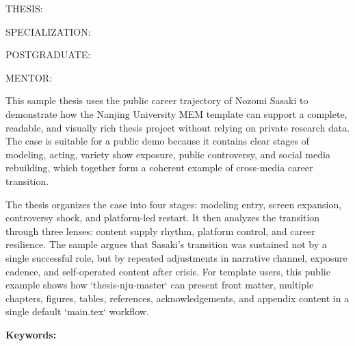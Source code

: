 
\noindent THESIS:\qquad \njuEnglishTitleValue

\vspace{0.9em}
\noindent SPECIALIZATION:\qquad \njuEnglishDisciplineValue

\vspace{0.9em}
\noindent POSTGRADUATE:\qquad \njuEnglishAuthorValue

\vspace{0.9em}
\noindent MENTOR:\qquad \njuEnglishSupervisorValue

\vspace{1.5em}

This sample thesis uses the public career trajectory of Nozomi Sasaki to
demonstrate how the Nanjing University MEM template can support a complete,
readable, and visually rich thesis project without relying on private research
data. The case is suitable for a public demo because it contains clear stages
of modeling, acting, variety show exposure, public controversy, and social
media rebuilding, which together form a coherent example of cross-media career
transition.

The thesis organizes the case into four stages: modeling entry, screen
expansion, controversy shock, and platform-led restart. It then analyzes the
transition through three lenses: content supply rhythm, platform control, and
career resilience. The sample argues that Sasaki's transition was sustained not
by a single successful role, but by repeated adjustments in narrative channel,
exposure cadence, and self-operated content after crisis. For template users,
this public example shows how `thesis-nju-master` can present front matter,
multiple chapters, figures, tables, references, acknowledgements, and appendix
content in a single default `main.tex` workflow.

\vspace{1.2em}
\noindent \textbf{Keywords:}\par
\njuKeywordsEnValue
